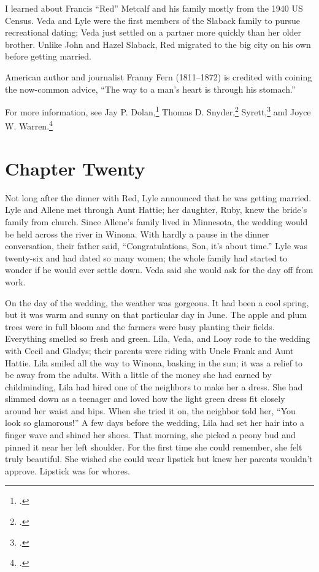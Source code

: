 \documentclass[
  american,
  letterpaper,
]{book}
\begin{document}
I learned about Francis ``Red'' Metcalf and his family mostly from the
1940 US Census. Veda and Lyle were the first members of the Slaback
family to pursue recreational dating; Veda just settled on a partner
more quickly than her older brother. Unlike John and Hazel Slaback, Red
migrated to the big city on his own before getting married.

American author and journalist Franny Fern (1811--1872) is credited with
coining the now-common advice, ``The way to a man's heart is through his
stomach.''

For more information, see Jay P. Dolan,\footnote{.} Thomas
D. Snyder,\footnote{.} Syrett,\footnote{.} and Joyce W. Warren.\footnote{.}


\chapter{Chapter Twenty}\label{chapter-twenty}

Not long after the dinner with Red, Lyle announced that he was getting
married. Lyle and Allene met through Aunt Hattie; her daughter, Ruby,
knew the bride's family from church. Since Allene's family lived in
Minnesota, the wedding would be held across the river in Winona. With
hardly a pause in the dinner conversation, their father said,
``Congratulations, Son, it's about time.'' Lyle was twenty-six and had
dated so many women; the whole family had started to wonder if he would
ever settle down. Veda said she would ask for the day off from work.

On the day of the wedding, the weather was gorgeous. It had been a cool
spring, but it was warm and sunny on that particular day in June. The
apple and plum trees were in full bloom and the farmers were busy
planting their fields. Everything smelled so fresh and green. Lila,
Veda, and Looy rode to the wedding with Cecil and Gladys; their parents
were riding with Uncle Frank and Aunt Hattie. Lila smiled all the way to
Winona, basking in the sun; it was a relief to be away from the adults.
With a little of the money she had earned by childminding, Lila had
hired one of the neighbors to make her a dress. She had slimmed down as
a teenager and loved how the light green dress fit closely around her
waist and hips. When she tried it on, the neighbor told her, ``You look
so glamorous!'' A few days before the wedding, Lila had set her hair
into a finger wave and shined her shoes. That morning, she picked a
peony bud and pinned it near her left shoulder. For the first time she
could remember, she felt truly beautiful. She wished she could wear
lipstick but knew her parents wouldn't approve. Lipstick was for whores.
\end{document}
